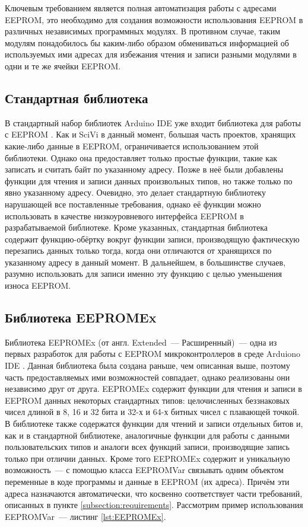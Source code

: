 Ключевым требованием является полная автоматизация работы с адресами EEPROM, это необходимо для создания возможности использования EEPROM в различных независимых программных модулях.
В противном случае, таким модулям понадобилось бы каким-либо образом обмениваться информацией об используемых ими адресах для избежания чтения и записи разными модулями в одни и те же ячейки EEPROM.


\subsection{Стандартная библиотека}

В стандартный набор библиотек Arduino IDE уже входит библиотека для работы с EEPROM \cite{web:arduino-eeprom}.
Как и SciVi в данный момент, большая часть проектов, хранящих какие-либо данные в EEPROM, ограничивается использованием этой библиотеки.
Однако она предоставляет только простые функции, такие как записать и считать байт по указанному адресу.
Позже в неё были добавлены функции для чтения и записи данных произвольных типов, но также только по явно указанному адресу.
Очевидно, это делает стандартную библиотеку нарушающей все поставленные требования, однако её функции можно использовать в качестве низкоуровневого интерфейса EEPROM в разрабатываемой библиотеке.
Кроме указанных, стандартная библиотека содержит функцию-обёртку вокруг функции записи, производящую фактическую перезапись данных только тогда, когда они отличаются от хранящихся по указанному адресу в данный момент.
В дальнейшем, в большинстве случаев, разумно использовать для записи именно эту функцию с целью уменьшения износа EEPROM.


\subsection{Библиотека EEPROMEx}

Библиотека EEPROMEx (от англ. Extended~--- Расширенный)~--- одна из первых разработок для работы с EEPROM микроконтроллеров в среде Arduiono IDE \cite{web:eepromex}.
Данная библиотека была создана раньше, чем описанная выше, поэтому часть предоставляемых ими возможностей совпадает, однако реализованы они независимо друг от друга.
EEPROMEx содержит функции для чтения и записи в EEPROM данных некоторых стандартных типов: целочисленных беззнаковых чисел длиной в 8, 16 и 32 бита и 32-х и 64-х битных чисел с плавающей точкой.
В библиотеке также содержатся функции для чтений и записи отдельных битов и, как и в стандартной библиотеке, аналогичные функции для работы с данными пользовательских типов и аналоги всех функций записи, производящие запись только при отличии данных.
Кроме того EEPROMEx содержит и уникальную возможность~--- с помощью класса EEPROMVar связывать одним объектом переменные в коде программы и данные в EEPROM (их адреса).
Причём эти адреса назначаются автоматически, что косвенно соответствует части требований, описанных в пункте \ref{subsection:requirements}.
Рассмотрим пример использования EEPROMVar~--- листинг \ref{lst:EEPROMEx}.

